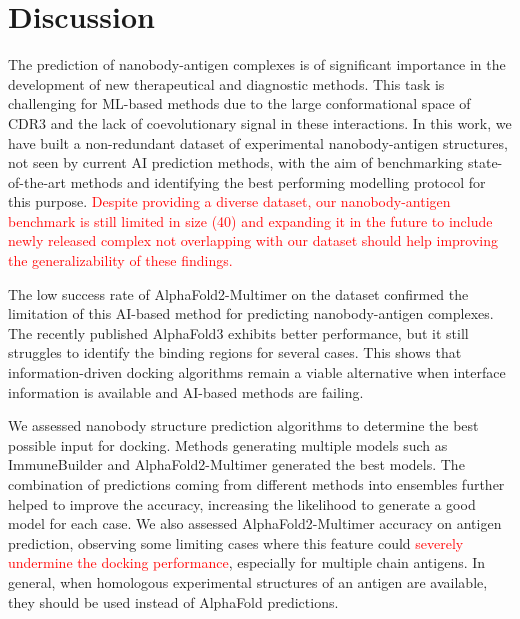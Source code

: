 \documentclass[12pt]{article}
\begin{document}
\section{Discussion}

The prediction of nanobody-antigen complexes is of significant importance in the development of new therapeutical and diagnostic methods. This task is challenging for ML-based methods due to the large conformational space of CDR3 and the lack of coevolutionary signal in these interactions. In this work, we have built a non-redundant dataset of experimental nanobody-antigen structures, not seen by current AI prediction methods, with the aim of benchmarking state-of-the-art methods and identifying the best performing modelling protocol for this purpose. \textcolor{Red}{Despite providing a diverse dataset, our nanobody-antigen benchmark is still limited in size (40) and expanding it in the future to include newly released complex not overlapping with our dataset should help improving the generalizability of these findings.}

The low success rate of AlphaFold2-Multimer on the dataset confirmed the limitation of this AI-based method for predicting nanobody-antigen complexes. The recently published AlphaFold3 \cite{abramson2024accurate} exhibits better performance, but it still struggles to identify the binding regions for several cases. This shows that information-driven docking algorithms remain a viable alternative when interface information is available and AI-based methods are failing.

We assessed nanobody structure prediction algorithms to determine the best possible input for docking. Methods generating multiple models such as ImmuneBuilder and AlphaFold2-Multimer generated the best models. The combination of predictions coming from different methods into ensembles further helped to improve the accuracy, increasing the likelihood to generate a good model for each case. We also assessed AlphaFold2-Multimer accuracy on antigen prediction, observing some limiting cases where this feature could \textcolor{Red}{severely undermine the docking performance}, especially for multiple chain antigens. In general, when homologous experimental structures of an antigen are available, they should be used instead of AlphaFold predictions.
\end{document}
